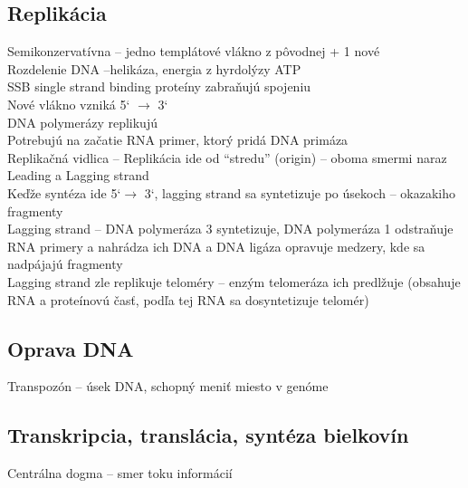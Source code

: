 \subsection*{Replikácia}
\tab Semikonzervatívna -- jedno templátové vlákno z pôvodnej + 1 nové\\
\tab Rozdelenie DNA --helikáza, energia z hyrdolýzy ATP\\
\tab \tab SSB single strand binding proteíny zabraňujú spojeniu\\
\tab Nové vlákno vzniká 5` $\rightarrow$ 3`\\
\tab DNA polymerázy replikujú\\
\tab \tab Potrebujú na začatie RNA primer, ktorý pridá DNA primáza\\
\tab Replikačná vidlica -- Replikácia ide od “stredu” (origin) -- oboma smermi naraz\\
\tab Leading a Lagging strand\\
\tab \tab Keďže syntéza ide 5`$\rightarrow$ 3`, lagging strand sa syntetizuje po úsekoch -- okazakiho fragmenty\\
\tab \tab Lagging strand -- DNA polymeráza 3 syntetizuje, DNA polymeráza 1 odstraňuje RNA primery a nahrádza ich DNA a  DNA ligáza opravuje medzery, kde sa nadpájajú fragmenty\\
\tab \tab Lagging strand zle replikuje teloméry -- enzým telomeráza ich predlžuje (obsahuje RNA a proteínovú časť, podľa tej RNA sa dosyntetizuje telomér)\\
\subsection*{Oprava DNA}
Transpozón -- úsek DNA, schopný meniť miesto v genóme\\
\subsection*{Transkripcia, translácia, syntéza bielkovín}
Centrálna dogma -- smer toku informácií\\

